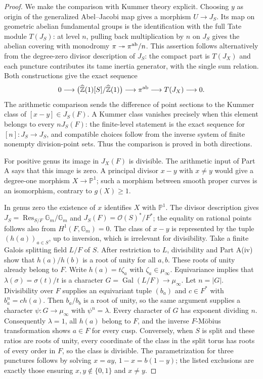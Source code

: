 \documentclass[11pt,a4paper]{article}
\begin{document}
\begin{proof}
We make the comparison with Kummer theory explicit.  Choosing $y$ as origin
of the generalized Abel--Jacobi map gives a morphism $U\to J_S$.  Its map on
geometric abelian fundamental groups is the identification with the full
Tate module $T(J_S)$: at level $n$, pulling back multiplication by $n$ on
$J_S$ gives the abelian covering with monodromy
$\pi\twoheadrightarrow\pi^{\rm ab}/n$.  This assertion follows alternatively
from the degree-zero divisor description of $J_S$: the compact part is
$T(J_X)$ and each puncture contributes its tame inertia generator, with the
single sum relation.  Both constructions give the exact sequence
\[
 0\longrightarrow
 \bigl(\widehat{\mathbb Z}(1)[S]/\widehat{\mathbb Z}(1)\bigr)
 \longrightarrow \pi^{\rm ab}\longrightarrow T(J_X)\longrightarrow0.
\]
The arithmetic comparison sends the difference of point sections to the
Kummer class of $[x-y]\in J_S(F)$.  A Kummer class vanishes precisely when
this element belongs to every $nJ_S(F)$: the finite-level statement is the
exact sequence for $[n]:J_S\to J_S$, and compatible choices follow from the
inverse system of finite nonempty division-point sets.  Thus the comparison
is proved in both directions.

For positive genus its image in $J_X(F)$ is divisible.  The arithmetic
input of Part A says that this image is zero.  A principal divisor $x-y$
with $x\ne y$ would give a degree-one morphism $X\to\mathbb P^1$; such a
morphism between smooth proper curves is an isomorphism, contrary to
$g(X)\geq1$.

In genus zero the existence of $x$ identifies $X$ with $\mathbb P^1$.
The divisor description gives
$J_S=\operatorname{Res}_{S/F}\mathbb G_m/\mathbb G_m$ and
$J_S(F)=\mathcal O(S)^*/F^*$; the equality on rational points follows also
from $H^1(F,\mathbb G_m)=0$.  The class of $x-y$ is represented by the tuple
$(h(a))_{a\in S}$, up to inversion, which is irrelevant for divisibility.
Take a finite Galois splitting field $L/F$ of $S$.  After restriction to $L$,
divisibility and Part A(iv) show that $h(a)/h(b)$ is a root of unity for
all $a,b$.  These roots of unity already belong to $F$.  Write
$h(a)=t\zeta_a$ with $\zeta_a\in\mu_\infty$.  Equivariance implies that
$\lambda(\sigma)=\sigma(t)/t$ is a character
$G=\operatorname{Gal}(L/F)\to\mu_\infty$.
Let $n=|G|$.  Divisibility over $F$ supplies an equivariant tuple $(b_a)$
and $c\in F^*$ with $b_a^n=c h(a)$.  Then $b_a/b_b$ is a root of unity,
so the same argument supplies a character $\psi:G\to\mu_\infty$ with
$\psi^n=\lambda$.  Every character of $G$ has exponent dividing $n$.
Consequently $\lambda=1$, all $h(a)$ belong to $F$, and the inverse
$F$-M\"obius transformation shows $a\in F$ for every cusp.  Conversely,
when $S$ is split and these ratios are roots of unity, every coordinate of
the class in the split torus has roots of every order in $F$, so the class
is divisible.  The parametrization for three punctures follows by solving
$x=ay$, $1-x=b(1-y)$; the listed exclusions are exactly those ensuring
$x,y\notin\{0,1\}$ and $x\ne y$.
\end{proof}
\end{document}
